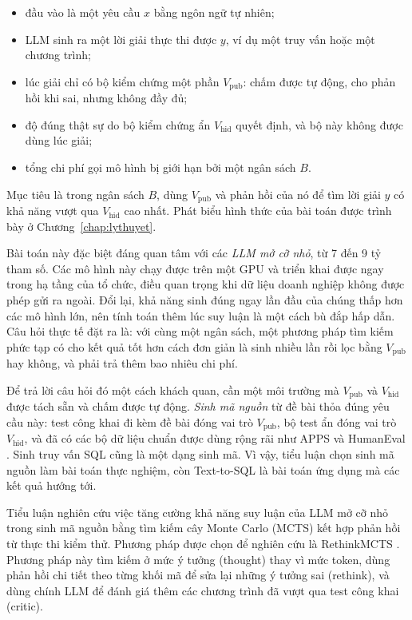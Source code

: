 \begin{itemize}
  \item đầu vào là một yêu cầu $x$ bằng ngôn ngữ tự nhiên;
  \item LLM sinh ra một lời giải thực thi được $y$, ví dụ một truy vấn hoặc một chương trình;
  \item lúc giải chỉ có bộ kiểm chứng một phần $V_{\text{pub}}$: chấm được tự động, cho phản hồi khi sai, nhưng không đầy đủ;
  \item độ đúng thật sự do bộ kiểm chứng ẩn $V_{\text{hid}}$ quyết định, và bộ này không được dùng lúc giải;
  \item tổng chi phí gọi mô hình bị giới hạn bởi một ngân sách $B$.
\end{itemize}

Mục tiêu là trong ngân sách $B$, dùng $V_{\text{pub}}$ và phản hồi của nó để tìm lời giải $y$ có khả năng vượt qua $V_{\text{hid}}$ cao nhất. Phát biểu hình thức của bài toán được trình bày ở Chương~\ref{chap:lythuyet}.

Bài toán này đặc biệt đáng quan tâm với các \emph{LLM mở cỡ nhỏ}, từ 7 đến 9 tỷ tham số. Các mô hình này chạy được trên một GPU và triển khai được ngay trong hạ tầng của tổ chức, điều quan trọng khi dữ liệu doanh nghiệp không được phép gửi ra ngoài. Đổi lại, khả năng sinh đúng ngay lần đầu của chúng thấp hơn các mô hình lớn, nên tính toán thêm lúc suy luận là một cách bù đắp hấp dẫn. Câu hỏi thực tế đặt ra là: với cùng một ngân sách, một phương pháp tìm kiếm phức tạp có cho kết quả tốt hơn cách đơn giản là sinh nhiều lần rồi lọc bằng $V_{\text{pub}}$ hay không, và phải trả thêm bao nhiêu chi phí.

Để trả lời câu hỏi đó một cách khách quan, cần một môi trường mà $V_{\text{pub}}$ và $V_{\text{hid}}$ được tách sẵn và chấm được tự động. \emph{Sinh mã nguồn} từ đề bài thỏa đúng yêu cầu này: test công khai đi kèm đề bài đóng vai trò $V_{\text{pub}}$, bộ test ẩn đóng vai trò $V_{\text{hid}}$, và đã có các bộ dữ liệu chuẩn được dùng rộng rãi như APPS \cite{hendrycks2021apps} và HumanEval \cite{chen2021humaneval}. Sinh truy vấn SQL cũng là một dạng sinh mã. Vì vậy, tiểu luận chọn sinh mã nguồn làm bài toán thực nghiệm, còn Text-to-SQL là bài toán ứng dụng mà các kết quả hướng tới.


Tiểu luận nghiên cứu việc tăng cường khả năng suy luận của LLM mở cỡ nhỏ trong sinh mã nguồn bằng tìm kiếm cây Monte Carlo (MCTS) kết hợp phản hồi từ thực thi kiểm thử. Phương pháp được chọn để nghiên cứu là RethinkMCTS \cite{li2024rethinkmcts}. Phương pháp này tìm kiếm ở mức ý tưởng (thought) thay vì mức token, dùng phản hồi chi tiết theo từng khối mã để sửa lại những ý tưởng sai (rethink), và dùng chính LLM để đánh giá thêm các chương trình đã vượt qua test công khai (critic).

